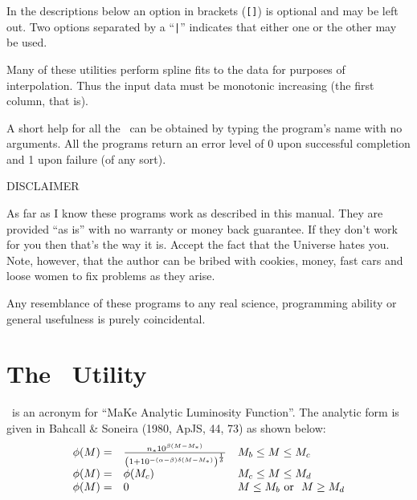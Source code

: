 \documentclass[11pt,twoside]{article}
\begin{document}
In the descriptions below an option in brackets ({\tt []}) is optional and may
be left out. Two options separated by a ``{\tt |}'' indicates that either one
or the other may be used.

Many of these utilities perform spline fits to the data for purposes of 
interpolation. Thus the input data must be monotonic increasing (the first
column, that is).

A short help for all the \gmu\ can be obtained by typing the program's name
with no arguments. All the programs return an error level of 0 upon successful
completion and 1 upon failure (of any sort).

\vspace{10mm}
\centerline{DISCLAIMER}
\nin As far as I know these programs work as described in this manual. They are
provided ``as is'' with no warranty or money back guarantee. If they don't
work for you then that's the way it is. Accept the fact that the Universe hates
you. Note, however, that the author can be bribed with cookies, money, fast 
cars and loose women to fix problems as they arise. 

\vspace{10mm}
\nin Any resemblance of these programs to any real science, programming 
ability or general usefulness is purely coincidental. 



\newpage
\section{The \mkalf\ Utility}

\mkalf\ is an acronym for ``MaKe Analytic Luminosity Function''. The analytic
form is given in Bahcall \& Soneira (1980, ApJS, 44, 73) as shown below:
\[
\begin{array}{lll}
\phi(M) = & \frac{n_\ast 10^{\beta(M-M_\ast)}}
{\left( 1 + 10^{-(\alpha - \beta)\delta(M-M_\ast)}\right)^{\frac{1}{\delta}}}
& M_b \leq M \leq M_c \nonumber \\
\phi(M) = & \phi(M_c) & M_c \leq M \leq M_d  \\
\phi(M) = & 0 & M \leq M_b {\rm ~or~~} M \geq M_d
\end{array}
\]
\end{document}
